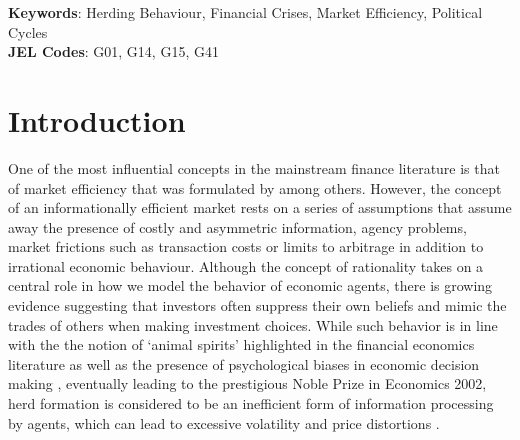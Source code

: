 \documentclass[
  letterpaper,
  DIV=11,
  numbers=noendperiod]{scrartcl}
\begin{document}
\noindent\textbf{Keywords}: Herding Behaviour, Financial Crises, Market Efficiency, Political Cycles
\\
\textbf{JEL Codes}: G01, G14, G15, G41
\newpage

\section{Introduction}\label{introduction}

One of the most influential concepts in the mainstream finance
literature is that of market efficiency that was formulated by
\citet{fama1970efficient} among others. However, the concept of an
informationally efficient market rests on a series of assumptions that
assume away the presence of costly and asymmetric information, agency
problems, market frictions such as transaction costs or limits to
arbitrage in addition to irrational economic behaviour. Although the
concept of rationality takes on a central role in how we model the
behavior of economic agents, there is growing evidence suggesting that
investors often suppress their own beliefs and mimic the trades of
others when making investment choices. While such behavior is in line
with the the notion of `animal spirits' highlighted in the financial
economics literature
\citep{kahneman2003maps, shiller2005behavioral, dai2020animal} as well
as the presence of psychological biases in economic decision making
\citep{kahneman2003maps}, eventually leading to the prestigious Noble
Prize in Economics 2002, herd formation is considered to be an
inefficient form of information processing by agents, which can lead to
excessive volatility and price distortions \citep[among
others][]{bikhchandani1992theory, nofsinger1999herding, kyle2001contagion, acharya2009prologue, ali2023anti}.
\end{document}
